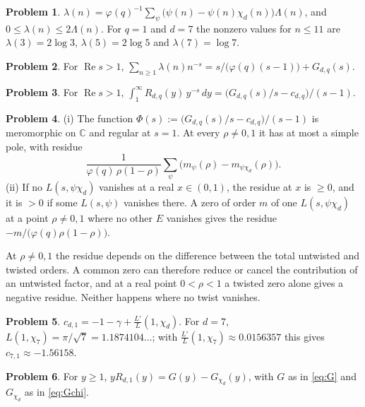 \documentclass[reqno]{amsart}
\theoremstyle{definition}
\newtheorem{problem}{Problem}[section]
\theoremstyle{plain}
\newcommand{\C}{\mathbb{C}}
\renewcommand{\Re}{\operatorname{Re}}
\begin{document}
\begin{problem}\label{pr:coef}
$\lambda(n) = \varphi(q)^{-1} \sum_\psi \bigl(\psi(n) - \psi(n)\chi_d(n)\bigr) \Lambda(n)$, and $0 \le \lambda(n) \le 2\Lambda(n)$.  For $q = 1$ and $d = 7$ the nonzero values for $n \le 11$ are $\lambda(3) = 2\log 3$, $\lambda(5) = 2\log 5$ and $\lambda(7) = \log 7$.
\end{problem}

\begin{problem}\label{pr:dirichlet-series}
For $\Re s > 1$,
\(
  \sum_{n \ge 1} \lambda(n) n^{-s} = s/\bigl(\varphi(q)(s-1)\bigr) + G_{d,q}(s)
\).
\end{problem}

\begin{problem}\label{pr:R-transform}
For $\Re s > 1$,
\(
  \int_1^\infty R_{d,q}(y)\, y^{-s} \, d y = \bigl(G_{d,q}(s)/s - c_{d,q}\bigr)/(s - 1)
\).
\end{problem}

\begin{problem}\label{pr:product}
(i) The function $\Phi(s) := \bigl(G_{d,q}(s)/s - c_{d,q}\bigr)/(s - 1)$ is meromorphic on $\C$ and regular at $s = 1$.  At every $\rho \ne 0, 1$ it has at most a simple pole, with residue
\[
  \frac{1}{\varphi(q)\, \rho(1 - \rho)} \sum_\psi \bigl( m_\psi(\rho) - m_{\psi\chi_d}(\rho) \bigr) .
\]
(ii) If no $L(s, \psi\chi_d)$ vanishes at a real $x \in (0, 1)$, the residue at $x$ is $\ge 0$, and it is $> 0$ if some $L(s, \psi)$ vanishes there.  A zero of order $m$ of one $L(s, \psi\chi_d)$ at a point $\rho \ne 0, 1$ where no other $E$ vanishes gives the residue $-m/\bigl(\varphi(q)\rho(1-\rho)\bigr)$.
\end{problem}

At $\rho \ne 0, 1$ the residue depends on the difference between the total untwisted and twisted orders.  A common zero can therefore reduce or cancel the contribution of an untwisted factor, and at a real point $0 < \rho < 1$ a twisted zero alone gives a negative residue.  Neither happens where no twist vanishes.

\begin{problem}\label{pr:c-value}
$c_{d,1} = -1 - \gamma + \frac{L'}{L}(1, \chi_d)$.  For $d = 7$, $L(1, \chi_7) = \pi/\sqrt 7 = 1.1874104\ldots$; with $\frac{L'}{L}(1, \chi_7) \approx 0.0156357$ this gives $c_{7,1} \approx -1.56158$.
\end{problem}

\begin{problem}\label{pr:G-difference}
For $y \ge 1$, $y R_{d,1}(y) = G(y) - G_{\chi_d}(y)$, with $G$ as in \eqref{eq:G} and $G_{\chi_d}$ as in \eqref{eq:Gchi}.
\end{problem}
\end{document}
